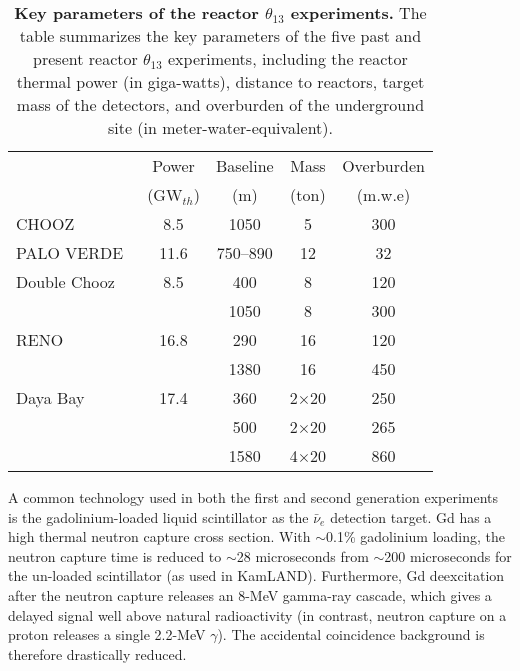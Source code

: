 \documentclass[aps,twocolumn,preprintnumbers,amsmath,superscriptaddress,amssymb,floats,nofootinbib]{revtex4-1}
\begin{document}
\begin{table}[tb]
  \begin{tabular}{lcccc}
  \hline
  & Power & Baseline & Mass & Overburden \\
  & (GW$_{th}$) & (m) & (ton) & (m.w.e)    \\
  \hline
  CHOOZ~\cite{Chooz}            & 8.5  & 1050  & 5    & 300\\
  PALO VERDE~\cite{Paloverde}   & 11.6 & 750--890  & 12  & 32\\
  \hline
  Double Chooz~\cite{DChooz}    & 8.5  & 400  & 8  & 120\\
                                &      & 1050 & 8  & 300\\
  RENO~\cite{Reno}              & 16.8 & 290  & 16   & 120\\
                                &      & 1380 & 16   & 450\\
  Daya Bay~\cite{Dayabay}       & 17.4 & 360  & 2$\times$20   & 250\\
                                &      & 500  & 2$\times$20   & 265\\
                                &      & 1580 & 4$\times$20   & 860\\
  \hline
  \end{tabular}
  \caption{{\bf Key parameters of the reactor $\theta_{13}$ experiments.} The table summarizes the key parameters of the five past and present reactor $\theta_{13}$ experiments, including the reactor thermal power (in giga-watts), distance to reactors, target mass of the detectors, and overburden of the underground site (in meter-water-equivalent).}
\label{tab:theta13}
\end{table}

A common technology used in both the first and second generation experiments is the gadolinium-loaded liquid scintillator as the $\bar\nu_{e}$ detection target.
Gd has a high thermal neutron capture cross section. With $\sim$0.1\% gadolinium loading, the neutron capture time is reduced to $\sim$28 microseconds from $\sim$200 microseconds for the un-loaded scintillator (as used in KamLAND).
Furthermore, Gd deexcitation after the neutron capture releases an 8-MeV gamma-ray cascade, which gives a delayed signal well above natural radioactivity (in contrast,
neutron capture on a proton releases a single 2.2-MeV $\gamma$). The accidental coincidence background is therefore drastically reduced.
\end{document}
